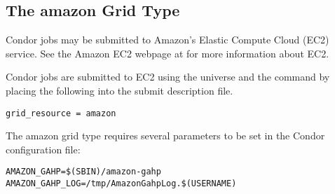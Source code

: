 \subsection{\label{sec:Amazon}The amazon Grid Type }

Condor jobs may be submitted to Amazon's Elastic Compute Cloud (EC2)
service.
See the Amazon EC2 webpage at  for more
information about EC2.

Condor jobs are submitted to EC2
using the  universe and the
 command  by placing the following
into the submit description file.
\begin{verbatim}
grid_resource = amazon
\end{verbatim}

The amazon grid type requires several parameters to be set in the Condor
configuration file:

\footnotesize
\begin{verbatim}
AMAZON_GAHP=$(SBIN)/amazon-gahp
AMAZON_GAHP_LOG=/tmp/AmazonGahpLog.$(USERNAME)
\end{verbatim}
\normalsize

